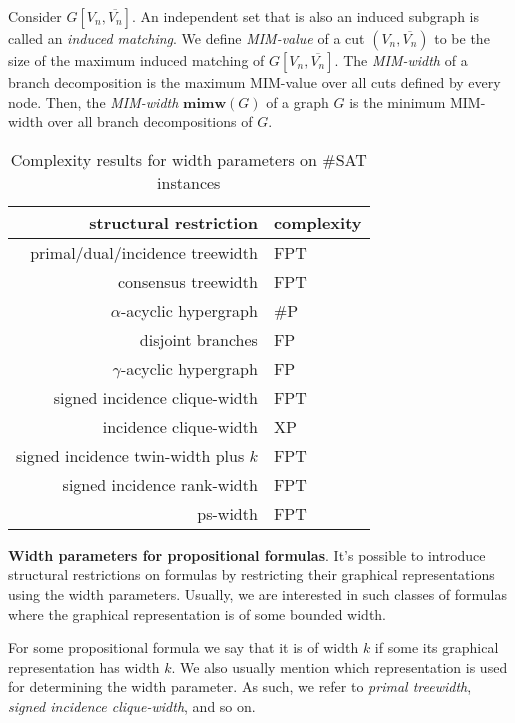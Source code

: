 \documentclass{article}
\begin{document}
Consider $G[V_n, \overline{V_n}]$.
An independent set that is also an induced subgraph is called an {\em induced matching}.
We define {\em MIM-value} of a cut $(V_n, \overline{V_n})$ to be the size of the maximum induced matching of $G[V_n, \overline{V_n}]$.
The {\em MIM-width} of a branch decomposition is the maximum MIM-value over all cuts defined by every node.
Then, the {\em MIM-width} $\mathbf{mimw}(G)$ of a graph $G$ is the minimum MIM-width over all branch decompositions of $G$.\\


\begin{table}
	\centering
	\begin{tabular}{r | l}
		\textbf{structural restriction} & \textbf{complexity} \\
		\hline
		primal/dual/incidence treewidth & FPT \cite{DBLP:journals/jda/SamerS10} \\
		consensus treewidth & FPT \cite{DBLP:conf/sat/GanianS17} \\
		\hline
		$\alpha$-acyclic hypergraph & \#P \cite{DBLP:conf/sat/CapelliDM14} \\
		disjoint branches & FP \cite{DBLP:conf/sat/CapelliDM14} \\
		$\gamma$-acyclic hypergraph & FP \cite{DBLP:conf/sat/CapelliDM14} \\
		\hline
		signed incidence clique-width & FPT \cite{DBLP:journals/dam/FischerMR08} \\
		incidence clique-width & XP \cite{DBLP:conf/isaac/SlivovskyS13} \\
		\hline
		signed incidence twin-width plus $k$ & FPT \cite{DBLP:conf/sat/GanianPSSS22} \\
		signed incidence rank-width & FPT \cite{DBLP:journals/fuin/GanianHO13} \\
		ps-width & FPT \cite{DBLP:conf/sat/SaetherTV14}
	\end{tabular}
	\caption{Complexity results for width parameters on \#SAT instances}
	\label{table:complexity}
\end{table}

\noindent
\textbf{Width parameters for propositional formulas}.
It's possible to introduce structural restrictions on formulas by restricting their graphical representations using the width parameters.
Usually, we are interested in such classes of formulas where the graphical representation is of some bounded width.

For some propositional formula we say that it is of width $k$ if some its graphical representation has width $k$.
We also usually mention which representation is used for determining the width parameter. As such, we refer to {\em primal treewidth}, {\em signed incidence clique-width}, and so on.
\end{document}
